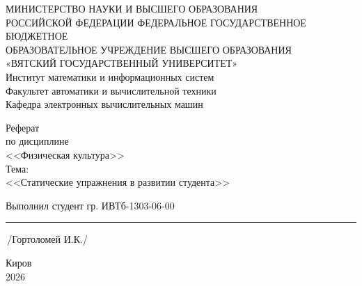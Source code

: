 \documentclass[oneside,a4paper,14pt]{extarticle}
\begin{document}
	\newpage\thispagestyle{empty}
	\begin{center}
		МИНИСТЕРСТВО НАУКИ И ВЫСШЕГО ОБРАЗОВАНИЯ\\
		РОССИЙСКОЙ ФЕДЕРАЦИИ
		ФЕДЕРАЛЬНОЕ ГОСУДАРСТВЕННОЕ БЮДЖЕТНОЕ\\
		ОБРАЗОВАТЕЛЬНОЕ
		УЧРЕЖДЕНИЕ ВЫСШЕГО ОБРАЗОВАНИЯ\\
		«ВЯТСКИЙ ГОСУДАРСТВЕННЫЙ УНИВЕРСИТЕТ»\\
		Институт математики и информационных систем\\
		Факультет автоматики и вычислительной техники\\
		Кафедра электронных вычислительных машин
	\end{center}
	\vspace{20mm}

	\begin{center}
		Реферат\\
		по дисциплине\\
		<<Физическая культура>>\\
		Тема: \\
		<<Статические упражнения в развитии студента>>\\
	\end{center}
	\vspace{48mm}

	\noindent
	Выполнил студент гр. ИВТб-1303-06-00 \hfill \rule[-0,5mm]{30mm}{0.15mm}\,/Гортоломей И.К./
	\newline
  
	\vfill
	\begin{center}
		Киров\\
		2026
	\end{center}

\end{document}
